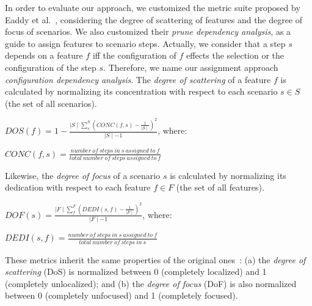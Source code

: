 In order to evaluate our approach, we customized the metric suite proposed by Eaddy et al.~\cite{Eaddy:2007aa},
considering the degree of scattering of features and the degree of focus of scenarios. We also customized their \emph{prune dependency analysis}, as a guide to
assign features to scenario steps. Actually, we consider that a step $s$ depends on a feature $f$ iff the configuration of $f$ effects the selection or the configuration of the step $s$. Therefore, we name our assignment approach
\emph{configuration dependency analysis}.  The \emph{degree of scattering} of a
feature $f$ is calculated by normalizing its concentration with respect to each
scenario $s \in S$ (the set of all scenarios).


%

\begin{center}
$DOS(f) = 1 - \frac{\mid S \mid \sum_{s}^{S}(CONC(f,s)-\frac{1}{\mid S
\mid})^2}{\mid S \mid -1}$, where:

$CONC(f,s) = \frac{number\ of\ steps\ in\ s\ assigned\ to\ f}{total\ number\
of\ steps\ assigned\ to\ f}$
\end{center}

Likewise, the \emph{degree of focus} of a scenario $s$ is calculated by
normalizing its dedication with respect to each feature $f \in F$ (the set of
all features).

\begin{center}
$DOF(s) = \frac{\mid F \mid \sum_{f}^{F}(DEDI(s,f)-\frac{1}{\mid F
\mid})^2}{\mid F \mid -1}$, where:

$DEDI(s,f) = \frac{number\ of\ steps\ in\ s\ assigned\ to\ f}{total\ number\
of\ steps\ in\ s}$
\end{center}

These metrics inherit the same properties of the original
ones~\cite{Eaddy:2007aa}: (a) the
\emph{degree of scattering} (DoS) is normalized between 0 (completely localized)
and 1 (completely unlocalized); and (b) the \emph{degree of focus} (DoF) is also
normalized between 0 (completely unfocused) and 1 (completely focused).

